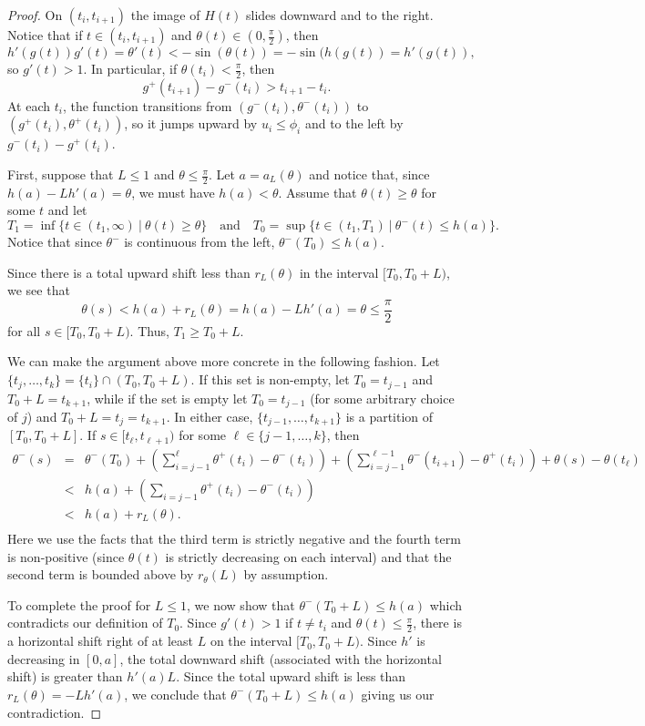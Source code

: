\documentclass{amsart}
\theoremstyle{plain}
\theoremstyle{definition}
\theoremstyle{remark}
\newcommand{\<}{\left <}
\renewcommand{\>}{\right >}
\begin{document}
\begin{proof}
On $(t_i,t_{i+1})$ the image of $H(t)$ slides downward and to the right. 
Notice that if $t\in (t_i,t_{i+1})$ and $\theta(t)\in \left(0,\frac{\pi}{2}\right)$, then
 $$h'(g(t))g'(t) = \theta'(t) < -\sin(\theta(t)) = -\sin(h(g(t)) = h'(g(t)),$$
so $g'(t) > 1$. In particular, if $\theta(t_i)<\frac{\pi}{2}$, then
$$g^+(t_{i+1}) - g^-(t_i) > t_{i+1}-t_i.$$
At each $t_i$, the function transitions from $(g^-(t_i),\theta^-(t_i))$ to
$(g^+(t_i),\theta^+(t_i))$, so it jumps upward by $u_i \le \phi_i$ and to the left by  $g^-(t_i)-g^+(t_i)$.

First, suppose that $L\le 1$ and $\theta\le\frac{\pi}{2}$.
Let $a = a_L(\theta)$ and notice that, since  $h(a) -Lh'(a) = \theta$, we must have $h(a)<\theta$. 
Assume that $\theta(t) \geq \theta$ for some $t$ and let
$$T_1 = \inf\{ t \in (t_1,\infty) \ | \ \theta(t) \geq \theta\}\quad\text{and}\quad T_0 = \sup\{ t \in (t_1,T_1) \ | \ \theta^-(t) \leq h(a)\}.$$
Notice that since $\theta^-$ is continuous from the left, $\theta^-(T_0)\le h(a)$.

Since there is a total upward shift less than $r_L(\theta)$ in the interval $[T_0,T_0+L)$, we see that 
$$\theta(s) < h(a)+r_L(\theta) = h(a) -Lh'(a) = \theta\le\frac{\pi}{2}$$
for all $s\in[T_0,T_0+L)$. Thus, 
 $T_1 \geq T_0+L$. 

We can make the argument above more concrete in the following fashion. Let $\{t_j,\ldots,t_k\}=\{t_i\}\cap (T_0,T_0+L)$.
If this set is non-empty, let $T_0=t_{j-1}$ and $T_0+L=t_{k+1}$, while if the set is empty let $T_0=t_{j-1}$ (for some arbitrary choice of $j$) and $T_0+L=t_j=t_{k+1}$.
In either case, $\{t_{j-1},\ldots,t_{k+1}\}$ is a partition of $[T_0,T_0+L]$.
If $s\in [t_{\ell},t_{\ell+1})$ for some $\ell\in\{j-1,\ldots,k\}$, then
\begin{eqnarray*}
\theta^-(s)&=&\theta^{-}(T_0)+ \left(\sum_{i=j-1}^\ell \theta^+(t_i)-\theta^-(t_i)\right)+\left(\sum_{i=j-1}^{\ell-1}  \theta^-(t_{i+1})-\theta^+(t_i)\right)+\theta(s)-\theta(t_\ell)\\
& < & h(a)+\left(\sum_{i=j-1} \theta^+(t_i)-\theta^-(t_i)\right)\\
&< &  h(a)+r_L(\theta).\\
\end{eqnarray*}
Here we use the facts that  the third term  is  strictly negative and the fourth term is non-positive (since $\theta(t)$ is strictly decreasing on each interval) and that
the second term is bounded above by $r_\theta(L)$ by assumption.

To complete the proof for $L \leq 1$, we now show that $\theta^-(T_0+L) \leq h(a)$ which contradicts our definition of $T_0$. Since $g'(t)>1$ if $t\ne t_i$ and  $\theta(t)\le\frac{\pi}{2}$, there  is a horizontal shift right of at least $L$ on the interval $[T_0,T_0+L)$. 
Since $h'$ is decreasing in $[0,a]$, the total downward shift (associated with the horizontal shift)
is greater than $h'(a)L$. Since the total upward shift is less than $r_L(\theta)=-Lh'(a)$, we conclude that  $\theta^-(T_0+L) \leq h(a)$ giving us our contradiction. 


\end{proof}
\end{document}
